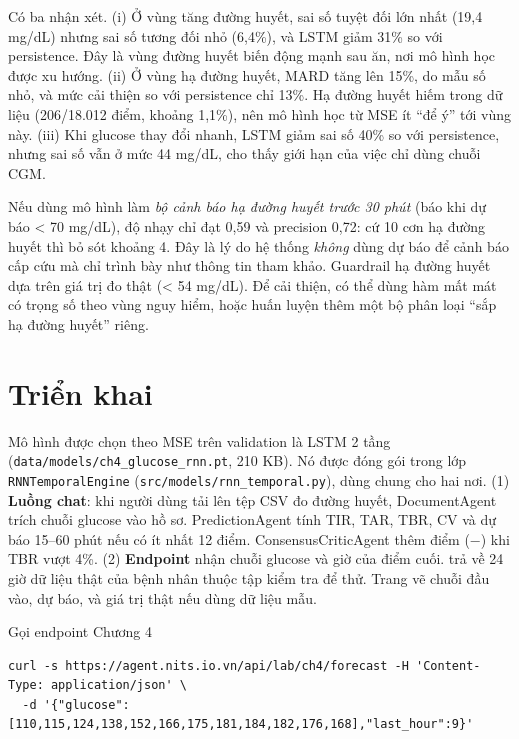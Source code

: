 Có ba nhận xét. (i) Ở vùng tăng đường huyết, sai số tuyệt đối lớn nhất (19,4 mg/dL) nhưng sai số tương đối nhỏ (6,4\%), và LSTM giảm 31\% so với persistence. Đây là vùng đường huyết biến động mạnh sau ăn, nơi mô hình học được xu hướng. (ii) Ở vùng hạ đường huyết, MARD tăng lên 15\%, do mẫu số nhỏ, và mức cải thiện so với persistence chỉ 13\%. Hạ đường huyết hiếm trong dữ liệu (206/18.012 điểm, khoảng 1,1\%), nên mô hình học từ MSE ít ``để ý'' tới vùng này. (iii) Khi glucose thay đổi nhanh, LSTM giảm sai số 40\% so với persistence, nhưng sai số vẫn ở mức 44 mg/dL, cho thấy giới hạn của việc chỉ dùng chuỗi CGM.

Nếu dùng mô hình làm \emph{bộ cảnh báo hạ đường huyết trước 30 phút} (báo khi dự báo < 70 mg/dL), độ nhạy chỉ đạt 0,59 và precision 0,72: cứ 10 cơn hạ đường huyết thì bỏ sót khoảng 4. Đây là lý do hệ thống \emph{không} dùng dự báo để cảnh báo cấp cứu mà chỉ trình bày như thông tin tham khảo. Guardrail hạ đường huyết dựa trên giá trị đo thật (< 54 mg/dL). Để cải thiện, có thể dùng hàm mất mát có trọng số theo vùng nguy hiểm, hoặc huấn luyện thêm một bộ phân loại ``sắp hạ đường huyết'' riêng.

\section{Triển khai}

Mô hình được chọn theo MSE trên validation là LSTM 2 tầng (\texttt{data/models/ch4\_glucose\_rnn.pt}, 210 KB). Nó được đóng gói trong lớp \texttt{RNNTemporalEngine} (\texttt{src/models/rnn\_temporal.py}), dùng chung cho hai nơi. (1) \textbf{Luồng chat}: khi người dùng tải lên tệp CSV đo đường huyết, DocumentAgent trích chuỗi glucose vào hồ sơ. PredictionAgent tính TIR, TAR, TBR, CV và dự báo 15–60 phút nếu có ít nhất 12 điểm. ConsensusCriticAgent thêm điểm (−) khi TBR vượt 4\%. (2) \textbf{Endpoint}  nhận chuỗi glucose và giờ của điểm cuối.  trả về 24 giờ dữ liệu thật của bệnh nhân thuộc tập kiểm tra để thử. Trang  vẽ chuỗi đầu vào, dự báo, và giá trị thật nếu dùng dữ liệu mẫu.

\begin{code}{Gọi endpoint Chương 4}
\label{lst:ch4-api}
\begin{verbatim}
curl -s https://agent.nits.io.vn/api/lab/ch4/forecast -H 'Content-Type: application/json' \
  -d '{"glucose":[110,115,124,138,152,166,175,181,184,182,176,168],"last_hour":9}'
\end{verbatim}
\end{code}

